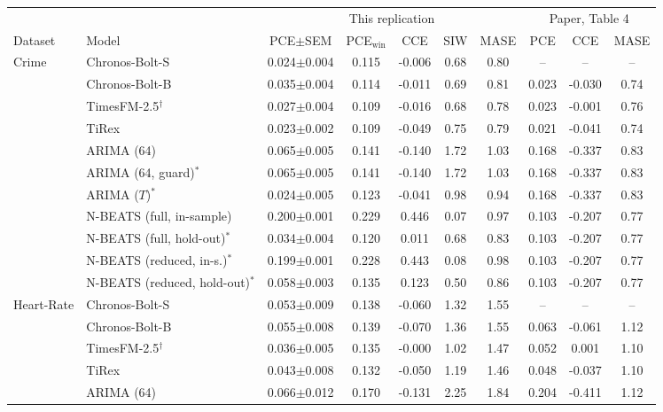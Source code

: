 \begin{tabular}{llcccccccc}
\toprule
 & & \multicolumn{5}{c}{This replication} & \multicolumn{3}{c}{Paper, Table 4} \\
\cmidrule(lr){3-7}\cmidrule(lr){8-10}
Dataset & Model & PCE$\pm$SEM & PCE$_{\mathrm{win}}$ & CCE & SIW & MASE & PCE & CCE & MASE \\
\midrule
\multirow{11}{*}{Crime} & Chronos-Bolt-S & 0.024$\pm$0.004 & 0.115 & -0.006 & 0.68 & 0.80 & -- & -- & -- \\
 & Chronos-Bolt-B & 0.035$\pm$0.004 & 0.114 & -0.011 & 0.69 & 0.81 & 0.023 & -0.030 & 0.74 \\
 & TimesFM-2.5$^\dagger$ & 0.027$\pm$0.004 & 0.109 & -0.016 & 0.68 & 0.78 & 0.023 & -0.001 & 0.76 \\
 & TiRex & 0.023$\pm$0.002 & 0.109 & -0.049 & 0.75 & 0.79 & 0.021 & -0.041 & 0.74 \\
 & ARIMA (64) & 0.065$\pm$0.005 & 0.141 & -0.140 & 1.72 & 1.03 & 0.168 & -0.337 & 0.83 \\
 & ARIMA (64, guard)$^\ast$ & 0.065$\pm$0.005 & 0.141 & -0.140 & 1.72 & 1.03 & 0.168 & -0.337 & 0.83 \\
 & ARIMA ($T$)$^\ast$ & 0.024$\pm$0.005 & 0.123 & -0.041 & 0.98 & 0.94 & 0.168 & -0.337 & 0.83 \\
 & N-BEATS (full, in-sample) & 0.200$\pm$0.001 & 0.229 & 0.446 & 0.07 & 0.97 & 0.103 & -0.207 & 0.77 \\
 & N-BEATS (full, hold-out)$^\ast$ & 0.034$\pm$0.004 & 0.120 & 0.011 & 0.68 & 0.83 & 0.103 & -0.207 & 0.77 \\
 & N-BEATS (reduced, in-s.)$^\ast$ & 0.199$\pm$0.001 & 0.228 & 0.443 & 0.08 & 0.98 & 0.103 & -0.207 & 0.77 \\
 & N-BEATS (reduced, hold-out)$^\ast$ & 0.058$\pm$0.003 & 0.135 & 0.123 & 0.50 & 0.86 & 0.103 & -0.207 & 0.77 \\
\midrule
\multirow{11}{*}{Heart-Rate} & Chronos-Bolt-S & 0.053$\pm$0.009 & 0.138 & -0.060 & 1.32 & 1.55 & -- & -- & -- \\
 & Chronos-Bolt-B & 0.055$\pm$0.008 & 0.139 & -0.070 & 1.36 & 1.55 & 0.063 & -0.061 & 1.12 \\
 & TimesFM-2.5$^\dagger$ & 0.036$\pm$0.005 & 0.135 & -0.000 & 1.02 & 1.47 & 0.052 & 0.001 & 1.10 \\
 & TiRex & 0.043$\pm$0.008 & 0.132 & -0.050 & 1.19 & 1.46 & 0.048 & -0.037 & 1.10 \\
 & ARIMA (64) & 0.066$\pm$0.012 & 0.170 & -0.131 & 2.25 & 1.84 & 0.204 & -0.411 & 1.12 \\

\end{tabular}
